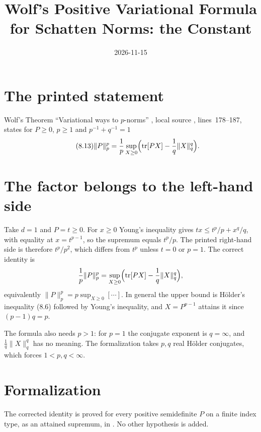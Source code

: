 \documentclass{article}
\title{Wolf's Positive Variational Formula for Schatten Norms: the Constant}
\author{}
\date{2026-11-15}
\begin{document}
\maketitle
{}

\section{The printed statement}
Wolf's Theorem ``Variational ways to $p$-norms'' \cite{Wolf2012Quantum},
local source ,
lines~178--187, states for $P\ge0$, $p\ge1$ and $p^{-1}+q^{-1}=1$
\begin{equation}\tag{8.13}
    \|P\|_p^p=\frac1p\sup_{X\ge0}\Bigl(\operatorname{tr}[PX]-\frac1q\|X\|_q^q\Bigr).
\end{equation}

\section{The factor belongs to the left-hand side}
Take $d=1$ and $P=t\ge0$. For $x\ge0$ Young's inequality gives
$tx\le t^p/p+x^q/q$, with equality at $x=t^{p-1}$, so the supremum equals
$t^p/p$. The printed right-hand side is therefore $t^p/p^2$, which differs from
$t^p$ unless $t=0$ or $p=1$. The correct identity is
\begin{equation*}
    \frac1p\|P\|_p^p=\sup_{X\ge0}\Bigl(\operatorname{tr}[PX]-\frac1q\|X\|_q^q\Bigr),
\end{equation*}
equivalently $\|P\|_p^p=p\sup_{X\ge0}[\cdots]$. In general the upper bound is
Hölder's inequality (8.6) followed by Young's inequality, and $X=P^{p-1}$
attains it since $(p-1)q=p$.

The formula also needs $p>1$: for $p=1$ the conjugate exponent is $q=\infty$,
and $\frac1q\|X\|_q^q$ has no meaning. The formalization takes $p,q$ real Hölder
conjugates, which forces $1<p,q<\infty$.

\section{Formalization}
The corrected identity is proved for every positive semidefinite $P$ on a
finite index type, as an attained supremum, in
. No other hypothesis is added.



\end{document}
